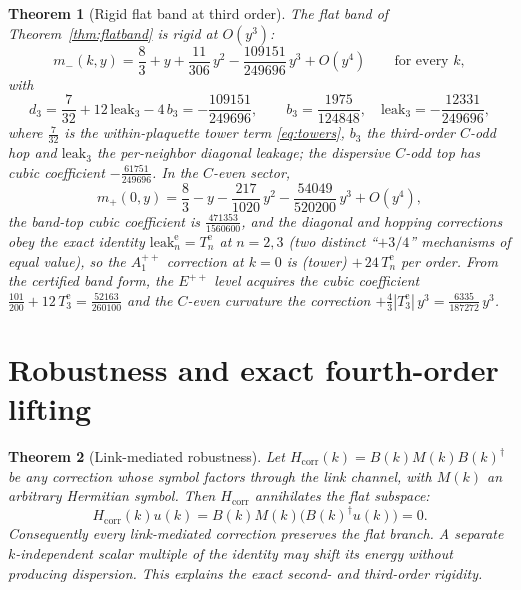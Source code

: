 \documentclass[11pt]{article}
\newtheorem{theorem}{Theorem}[section]
\begin{document}
\begin{theorem}[Rigid flat band at third order]\label{thm:thirdorder}
The flat band of Theorem~\ref{thm:flatband} is rigid at $O(y^3)$:
\begin{equation}
m_-(k,y)=\frac83+y+\frac{11}{306}\,y^2-\frac{109151}{249696}\,y^3+O(y^4)
\qquad\text{for every }k,
\end{equation}
with
\begin{equation}
d_3=\frac{7}{32}+12\,\mathrm{leak}_3-4\,b_3=-\frac{109151}{249696},
\qquad
b_3=\frac{1975}{124848},\quad
\mathrm{leak}_3=-\frac{12331}{249696},
\end{equation}
where $\tfrac{7}{32}$ is the within-plaquette tower term \eqref{eq:towers},
$b_3$ the third-order $C$-odd hop and $\mathrm{leak}_3$ the per-neighbor
diagonal leakage; the dispersive $C$-odd top has cubic coefficient
$-\tfrac{61751}{249696}$. In the $C$-even sector,
\begin{equation}
m_+(0,y)=\frac83-y-\frac{217}{1020}\,y^2-\frac{54049}{520200}\,y^3+O(y^4),
\end{equation}
the band-top cubic coefficient is $\tfrac{471353}{1560600}$, and the diagonal
and hopping corrections obey the exact identity
$\mathrm{leak}^{\mathrm e}_n=T^{\mathrm e}_n$ at $n=2,3$ (two distinct
``$+3/4$'' mechanisms of equal value), so the $A_1^{++}$ correction at $k=0$
is (tower) $+\,24\,T^{\mathrm e}_n$ per order. From the certified band form,
the $E^{++}$ level acquires the cubic coefficient
$\tfrac{101}{200}+12\,T_3^{\mathrm e}=\tfrac{52163}{260100}$ and the
$C$-even curvature the correction
$+\tfrac43|T_3^{\mathrm e}|\,y^3=\tfrac{6335}{187272}\,y^3$.
\end{theorem}

\section{Robustness and exact fourth-order lifting}
\label{sec:robust}

\begin{theorem}[Link-mediated robustness]\label{thm:robust}
Let $H_{\mathrm{corr}}(k)=B(k)M(k)B(k)^\dagger$ be any correction whose
symbol factors through the link channel, with $M(k)$ an arbitrary Hermitian
symbol. Then $H_{\mathrm{corr}}$ annihilates the flat subspace:
\[
H_{\mathrm{corr}}(k)u(k)
=B(k)M(k)\bigl(B(k)^\dagger u(k)\bigr)=0.
\]
Consequently every link-mediated correction preserves the flat branch. A
separate $k$-independent scalar multiple of the identity may shift its energy
without producing dispersion. This explains the exact
second- and third-order rigidity.
\end{theorem}
\end{document}
